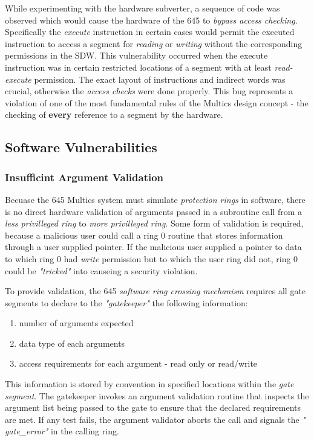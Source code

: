 While experimenting with the hardware subverter, a sequence of code was observed which would cause the hardware 
of the 645 to \textit{bypass access checking}. Specifically the \textit{execute} instruction in certain cases 
would permit the executed instruction to access a segment for \textit{reading} or \textit{writing} without the 
corresponding permissions in the SDW.
This vulnerability occurred when the execute instruction was in certain restricted locations of a segment with 
at least \textit{read-execute} permission.
The exact layout of instructions and indirect words was crucial, otherwise the \textit{access checks} were done 
properly.
This bug represents a violation of one of the most fundamental rules of the Multics design concept - the checking 
of \textbf{every} reference to a segment by the hardware.

\subsection{Software Vulnerabilities}

\subsubsection{Insufficint Argument Validation}

Becuase the 645 Multics system must simulate \textit{protection rings} in software, there is no direct hardware 
validation of arguments passed in a subroutine call from a \textit{less privilleged ring} to \textit{more 
privilleged ring}. Some form of validation is required, because a malicious user could call a ring 0 routine 
that stores information through a user supplied pointer.
If the malicious user supplied a pointer to data to which ring 0 had \textit{write} permission but to which the 
user ring did not, ring 0 could be \textit{"tricked"} into causeing a security violation.

To provide validation, the 645 \textit{software ring crossing mechanism} requires all gate segments to declare to 
the \textit{"gatekeeper"} the following information:
\begin{enumerate}
    \item number of arguments expected
    \item data type of each arguments
    \item access requirements for each argument - read only or read/write
\end{enumerate} 
This information is stored by convention in specified locations within the \textit{gate segment}. The gatekeeper 
invokes an argument validation routine that inspects the argument list being passed to the gate to ensure that the 
declared requirements are met. If any test fails, the argument validator aborts the call and signals the \textit{"
gate_error"} in the calling ring.

